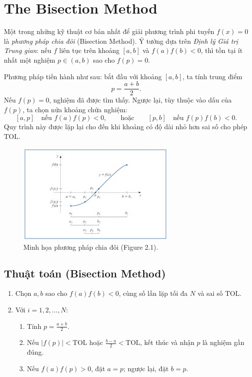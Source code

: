 \section{The Bisection Method}

Một trong những kỹ thuật cơ bản nhất để giải phương trình phi tuyến $f(x) = 0$ là 
\textit{phương pháp chia đôi} (Bisection Method). 
Ý tưởng dựa trên \textit{Định lý Giá trị Trung gian}: 
nếu $f$ liên tục trên khoảng $[a,b]$ và $f(a)f(b) < 0$, 
thì tồn tại ít nhất một nghiệm $p \in (a,b)$ sao cho $f(p) = 0$.  

Phương pháp tiến hành như sau:  
bắt đầu với khoảng $[a,b]$, ta tính trung điểm
\[
p = \frac{a+b}{2}.
\]
Nếu $f(p) = 0$, nghiệm đã được tìm thấy. 
Ngược lại, tùy thuộc vào dấu của $f(p)$, ta chọn nửa khoảng chứa nghiệm:  
\[
[a,p] \quad \text{nếu } f(a)f(p)<0, 
\qquad \text{hoặc} \qquad
[p,b] \quad \text{nếu } f(p)f(b)<0.
\]
Quy trình này được lặp lại cho đến khi khoảng có độ dài nhỏ hơn sai số cho phép $\text{TOL}$.

\begin{figure}[h!]
\centering
\includegraphics[width=0.7\textwidth]{assets/figure2.1.png}
\caption{Minh họa phương pháp chia đôi (Figure 2.1).}
\label{fig:bisection-fig21}
\end{figure}

\subsection*{\textbf{Thuật toán (Bisection Method)}}

\begin{enumerate}
    \item Chọn $a, b$ sao cho $f(a)f(b)<0$, cùng số lần lặp tối đa $N$ và sai số $\text{TOL}$.
    \item Với $i=1,2,\dots,N$:
    \begin{enumerate}
        \item Tính $p = \tfrac{a+b}{2}$.
        \item Nếu $|f(p)| < \text{TOL}$ hoặc $\tfrac{b-a}{2} < \text{TOL}$, kết thúc và nhận $p$ là nghiệm gần đúng.
        \item Nếu $f(a)f(p)>0$, đặt $a=p$; ngược lại, đặt $b=p$.
    \end{enumerate}
\end{enumerate}

